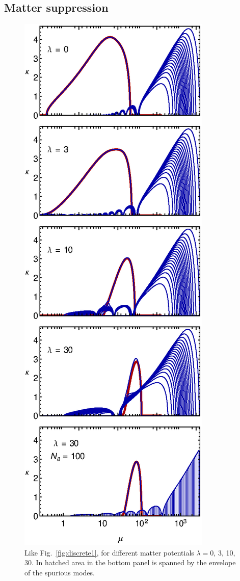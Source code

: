 \documentclass[twocolumn,prd,showpacs,
floatfix,preprintnumbers,nofootinbib]{revtex4}
\begin{document}
\subsection{Matter suppression}
\begin{figure}
\includegraphics[width=0.8\columnwidth]{discrete_lamda.eps}
\caption{Like Fig.~\ref{fig:discrete1}, for different matter potentials $\lambda=0$, 3, 10, 30. In hatched area in the bottom panel is spanned by the envelope of the spurious modes.
\label{fig:discrete2}}
\end{figure}
\end{document}
